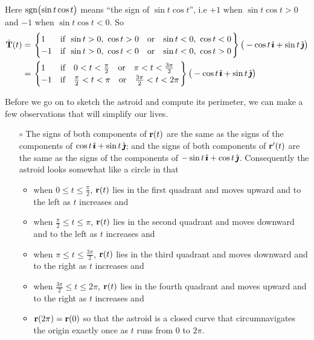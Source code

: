 \begin{eg}
Here $\operatorname{sgn}\!\big(\!\sin t\cos t\big)$ means ``the sign of $\sin t\cos t$'', i.e $+1$ when $\sin t\cos t>0$ and $-1$ when $\sin t\cos t<0$. So
\begin{align*}
\hat\vT(t) 
 &=\left.\begin{cases}1&\text{if $\ \sin t>0,\ \cos t>0\ \ $ 
                              or $\ \ \sin t<0,\ \cos t<0$}\\
                           -1&\text{if $\ \sin t>0,\ \cos t<0\ \ $ 
                              or $\ \ \sin t<0,\ \cos t>0$}
                \end{cases}\right\}\big(-\cos t\,\hi+\sin t\,\hj\big)
\\
 &=\left.\begin{cases}1&\text{if $\ \ 0< t<\frac{\pi}{2}\ \ $ 
                                            or $\ \ \pi< t<\frac{3\pi}{2}$}\\
                           -1&\text{if $\ \ \frac{\pi}{2}<t<\pi\ \ $ 
                                          or $\ \ \frac{3\pi}{2}<t<2\pi$}
                \end{cases}\right\}\big(-\cos t\,\hi+\sin t\,\hj\big)
\end{align*}

Before we go on to sketch the astroid and compute its perimeter, we can 
make a few observations that will simplify our lives. 
\begin{itemize}\itemsep1pt \parskip0pt  %
\item[$\circ$]
The signs of both components
of $\mathbf{r}(t)$ are the same as the signs of the components of
$\cos t\,\hat{\pmb{\imath}} +\sin t\,\hat{\pmb{\jmath}}$; and the signs of both components
of $\mathbf{r}'(t)$ are the same as the signs of the components of
$-\sin t\,\hat{\pmb{\imath}} +\cos t\,\hat{\pmb{\jmath}}$.
Consequently the astroid looks somewhat like a circle in that
\begin{itemize}\itemsep1pt \parskip0pt  %
\item 
when $0\le t\le \frac{\pi}{2}$, $\mathbf{r}(t)$ lies in the first quadrant
and moves upward and to the left as $t$ increases and
\item 
when $\frac{\pi}{2}\le t\le \pi$, $\mathbf{r}(t)$ lies in the second 
quadrant and moves downward and to the left as $t$ increases and
\item 
when $\pi\le t\le \frac{3\pi}{2}$, $\mathbf{r}(t)$ lies in the third quadrant
and moves downward and to the right as $t$ increases and
\item 
when $\frac{3\pi}{2}\le t\le 2\pi$, $\mathbf{r}(t)$ lies in the fourth
quadrant and moves upward and to the right as $t$ increases and
\item 
$\mathbf{r}(2\pi)=\mathbf{r}(0)$ so that the astroid is a closed curve that
circumnavigates the origin exactly once as $t$ runs from $0$ to $2\pi$.
\end{itemize}


\end{itemize}
\end{eg}
